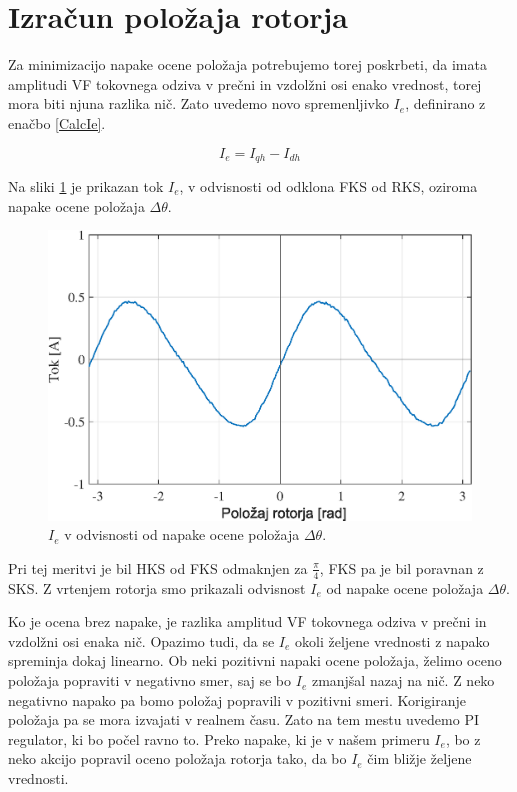 \documentclass[a4paper,twoside,openright,12pt,slovene]{book}
\begin{document}
\newpage
\section{Izračun položaja rotorja}

Za minimizacijo napake ocene položaja potrebujemo torej poskrbeti, da imata amplitudi VF tokovnega odziva v prečni in vzdolžni osi enako vrednost, torej mora biti njuna razlika nič. Zato uvedemo novo
spremenljivko $I_e$, definirano z enačbo \ref{CalcIe}.

\begin{equation} \label{CalcIe}
    I_e = I_{qh} - I_{dh}
\end{equation}

Na sliki \ref{reguliranaVelicinaIdq0} je prikazan tok $I_e$, v odvisnosti od odklona FKS od RKS, oziroma napake ocene položaja $\Delta\theta$. 

\begin{figure}[!htbp]
    \centering
    \includegraphics[width=0.9\columnwidth]{Slike/reguliranaVelicinaIdq0.eps}
    \caption{\label{reguliranaVelicinaIdq0} $I_e$ v odvisnosti od napake ocene položaja $\Delta\theta$.}
\end{figure}

Pri tej meritvi je bil HKS od FKS odmaknjen za $\frac{\pi}{4}$, FKS pa je bil poravnan z SKS. Z vrtenjem rotorja smo prikazali odvisnost $I_e$ od napake ocene položaja $\Delta\theta$. 

Ko je ocena brez napake, je razlika amplitud VF tokovnega odziva v prečni in vzdolžni osi enaka nič. Opazimo tudi, da se $I_e$ okoli željene vrednosti z napako spreminja dokaj linearno. Ob neki
pozitivni napaki ocene položaja, želimo oceno položaja popraviti v negativno smer, saj se bo $I_e$ zmanjšal nazaj na nič. Z neko negativno napako pa bomo položaj popravili v pozitivni smeri.
Korigiranje položaja pa se mora izvajati v realnem času. Zato na tem mestu uvedemo PI regulator, ki bo počel ravno to. Preko napake, ki je v našem primeru $I_e$, bo z neko akcijo popravil oceno
položaja rotorja tako, da bo $I_e$ čim bližje željene vrednosti.
\end{document}
